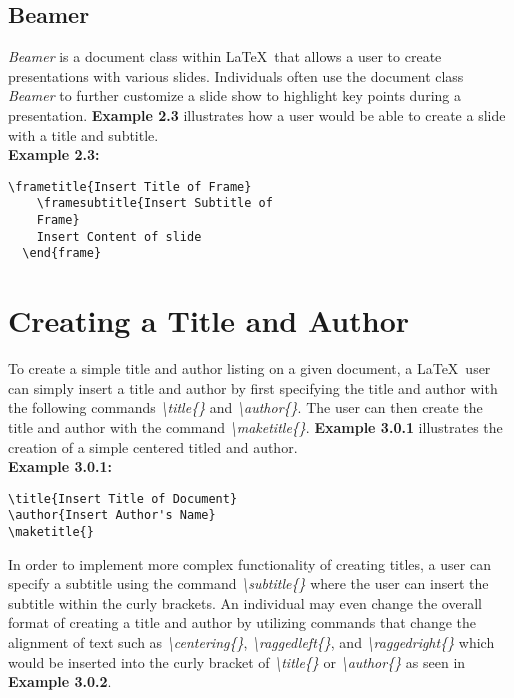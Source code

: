 \documentclass[11pt,twocolumn]{article}
\begin{document}
\subsection{Beamer}

\textit{Beamer} is a document class within \LaTeX\ that allows a user to create presentations with various slides. Individuals often use the document class \textit{Beamer} to further customize a slide show to highlight key points during a presentation. \textbf{Example 2.3} illustrates how a user would be able to create a slide with a title and subtitle.\\

\noindent \textbf{Example 2.3:}
\begin{verbatim}
\frametitle{Insert Title of Frame}
    \framesubtitle{Insert Subtitle of 
    Frame}
    Insert Content of slide
  \end{frame}
\end{verbatim}

\section{Creating a Title and Author}
To create a simple title and author listing on a given document, a \LaTeX\ user can simply insert a title and author by first specifying the title and author with the following commands \textit{\textbackslash title\{\}} and \textit{\textbackslash author\{\}}. The user can then create the title and author with the command \textit{\textbackslash maketitle\{\}}. \textbf{Example 3.0.1} illustrates the creation of a simple centered titled and author.\\

\noindent \textbf{Example 3.0.1:}
\begin{verbatim}
\title{Insert Title of Document}
\author{Insert Author's Name}
\maketitle{}
\end{verbatim}

In order to implement more complex functionality of creating titles, a user can specify a subtitle using the command \textit{\textbackslash subtitle\{\}} where the user can insert the subtitle within the curly brackets. An individual may even change the overall format of creating a title and author by utilizing commands that change the alignment of text such as \textit{\textbackslash centering\{\}}, \textit{\textbackslash raggedleft\{\}}, and \textit{\textbackslash raggedright\{\}} which would be inserted into the curly bracket of \textit{\textbackslash title\{\}} or \textit{\textbackslash author\{\}} as seen in \textbf{Example 3.0.2}.\\
\end{document}
